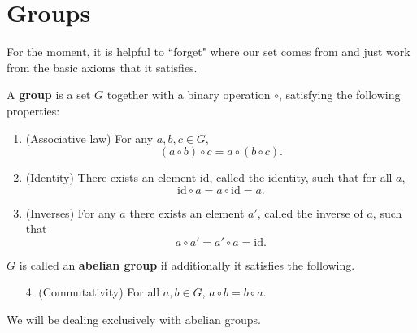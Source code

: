 \section{Groups}\label{groups}
For the moment, it is helpful to ``forget" where our set comes from and just work from the basic axioms that it satisfies. %
\begin{df}
A \textbf{group} is a set $G$ together with a binary operation $\circ$, satisfying the following properties: %
\begin{enumerate}
\item (Associative law) For any $a,b,c\in G$, \[(a\circ b)\circ c=a\circ (b\circ c).\]
\item (Identity) There exists an element id, called the identity, such that for all $a$,
\[\text{id}\circ a=a\circ \text{id}=a.\]
\item (Inverses) For any $a$ there exists an element $a'$, called the inverse of $a$, such that 
\[a\circ a'=a'\circ a=\text{id}.\]
\end{enumerate}
$G$ is called an \textbf{abelian group} if additionally it satisfies the following.
\begin{enumerate}
\item[4.] (Commutativity) For all $a,b\in G$, $a\circ b=b\circ a$.
\end{enumerate}
\end{df}
We will be dealing exclusively with abelian groups.

